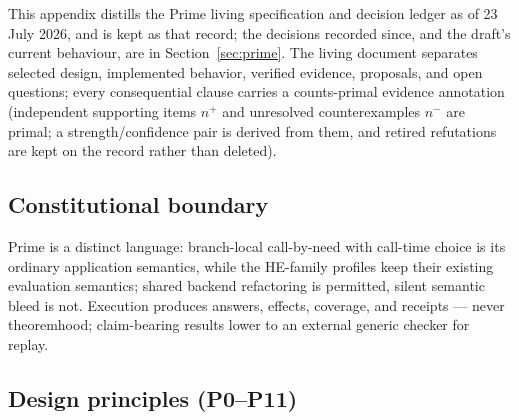 \documentclass[11pt]{article}
\newcommand{\HE}{\textup{HE}}
\begin{document}
This appendix distills the Prime living specification and decision ledger
as of 23 July 2026, and is kept as that record; the decisions recorded since,
and the draft's current behaviour, are in Section~\ref{sec:prime}.  The living document separates selected design,
implemented behavior, verified evidence, proposals, and open questions;
every consequential clause carries a counts-primal evidence annotation
(independent supporting items $n^{+}$ and unresolved counterexamples
$n^{-}$ are primal; a strength/confidence pair is derived from them, and
retired refutations are kept on the record rather than deleted).

\subsection{Constitutional boundary}

Prime is a distinct language: branch-local call-by-need with call-time
choice is its ordinary application semantics, while the \HE{}-family
profiles keep their existing evaluation semantics; shared backend
refactoring is permitted, silent semantic bleed is not.  Execution
produces answers, effects, coverage, and receipts --- never theoremhood;
claim-bearing results lower to an external generic checker for replay.

\subsection{Design principles (P0--P11)}
\end{document}
